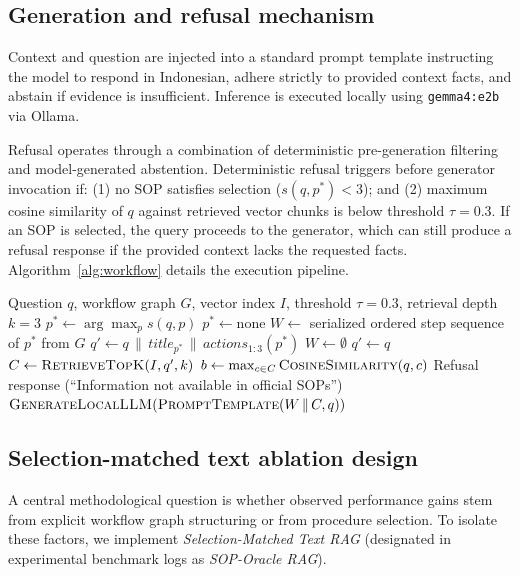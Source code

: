 \documentclass[preprint,10pt]{elsarticle}
\begin{document}
\subsection{Generation and refusal mechanism}
Context and question are injected into a standard prompt template instructing the model to respond in Indonesian, adhere strictly to provided context facts, and abstain if evidence is insufficient. Inference is executed locally using \texttt{gemma4:e2b} via Ollama.

Refusal operates through a combination of deterministic pre-generation filtering and model-generated abstention. Deterministic refusal triggers before generator invocation if: (1) no SOP satisfies selection ($s(q,p^\ast) < 3$); and (2) maximum cosine similarity of $q$ against retrieved vector chunks is below threshold $\tau = 0.3$. If an SOP is selected, the query proceeds to the generator, which can still produce a refusal response if the provided context lacks the requested facts. Algorithm~\ref{alg:workflow} details the execution pipeline.

\begin{algorithm}[!htbp]
\caption{Execution pipeline of Process-Aware Workflow GraphRAG}
\label{alg:workflow}
\begin{algorithmic}[1]
\REQUIRE Question $q$, workflow graph $G$, vector index $I$, threshold $\tau = 0.3$, retrieval depth $k=3$
\STATE $p^\ast \leftarrow \arg\max_p s(q,p)$ 
  \STATE $p^\ast \leftarrow \text{none}$
\ENDIF
{}
  \STATE $W \leftarrow$ serialized ordered step sequence of $p^\ast$ from $G$
  \STATE $q' \leftarrow q \,\|\, \textit{title}_{p^\ast} \,\|\, \textit{actions}_{1:3}(p^\ast)$ 
\ELSE
  \STATE $W \leftarrow \emptyset$
  \STATE $q' \leftarrow q$ 
\ENDIF
\STATE $C \leftarrow \textsc{RetrieveTopK}(I, q', k)$
\STATE $b \leftarrow \max_{c \in C} \textsc{CosineSimilarity}(q, c)$
  \RETURN Refusal response (``Information not available in official SOPs'')
\ENDIF
\RETURN $\textsc{GenerateLocalLLM}(\textsc{PromptTemplate}(W \,\|\, C, q))$
\end{algorithmic}
\end{algorithm}

\subsection{Selection-matched text ablation design}
\label{sec:ablation-oracle}
A central methodological question is whether observed performance gains stem from explicit workflow graph structuring or from procedure selection. To isolate these factors, we implement \emph{Selection-Matched Text RAG} (designated in experimental benchmark logs as \emph{SOP-Oracle RAG}).
\end{document}
